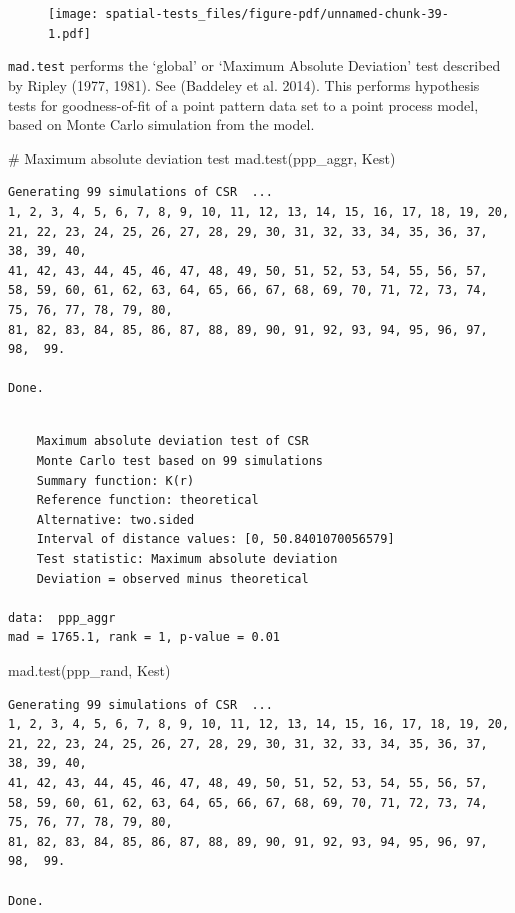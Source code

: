 \documentclass[
  letterpaper,
]{book}
\newenvironment{Shaded}{\begin{snugshade}}{\end{snugshade}}
\newcommand{\CommentTok}[1]{\textcolor[rgb]{0.37,0.37,0.37}{#1}}
\newcommand{\FunctionTok}[1]{\textcolor[rgb]{0.28,0.35,0.67}{#1}}
\newcommand{\NormalTok}[1]{\textcolor[rgb]{0.00,0.23,0.31}{#1}}
\begin{document}
\begin{figure}[H]

\texttt{[image: spatial-tests\_files/figure-pdf/unnamed-chunk-39-1.pdf]} \hfill{}

\end{figure}

\texttt{mad.test} performs the `global' or `Maximum Absolute Deviation'
test described by Ripley (1977, 1981). See (Baddeley et al. 2014). This
performs hypothesis tests for goodness-of-fit of a point pattern data
set to a point process model, based on Monte Carlo simulation from the
model.

\begin{Shaded}
\begin{Highlighting}[]
\CommentTok{\# Maximum absolute deviation test}
\FunctionTok{mad.test}\NormalTok{(ppp\_aggr, Kest)}
\end{Highlighting}
\end{Shaded}

\begin{verbatim}
Generating 99 simulations of CSR  ...
1, 2, 3, 4, 5, 6, 7, 8, 9, 10, 11, 12, 13, 14, 15, 16, 17, 18, 19, 20, 21, 22, 23, 24, 25, 26, 27, 28, 29, 30, 31, 32, 33, 34, 35, 36, 37, 38, 39, 40,
41, 42, 43, 44, 45, 46, 47, 48, 49, 50, 51, 52, 53, 54, 55, 56, 57, 58, 59, 60, 61, 62, 63, 64, 65, 66, 67, 68, 69, 70, 71, 72, 73, 74, 75, 76, 77, 78, 79, 80,
81, 82, 83, 84, 85, 86, 87, 88, 89, 90, 91, 92, 93, 94, 95, 96, 97, 98,  99.

Done.
\end{verbatim}

\begin{verbatim}

    Maximum absolute deviation test of CSR
    Monte Carlo test based on 99 simulations
    Summary function: K(r)
    Reference function: theoretical
    Alternative: two.sided
    Interval of distance values: [0, 50.8401070056579]
    Test statistic: Maximum absolute deviation
    Deviation = observed minus theoretical

data:  ppp_aggr
mad = 1765.1, rank = 1, p-value = 0.01
\end{verbatim}

\begin{Shaded}
\begin{Highlighting}[]
\FunctionTok{mad.test}\NormalTok{(ppp\_rand, Kest)}
\end{Highlighting}
\end{Shaded}

\begin{verbatim}
Generating 99 simulations of CSR  ...
1, 2, 3, 4, 5, 6, 7, 8, 9, 10, 11, 12, 13, 14, 15, 16, 17, 18, 19, 20, 21, 22, 23, 24, 25, 26, 27, 28, 29, 30, 31, 32, 33, 34, 35, 36, 37, 38, 39, 40,
41, 42, 43, 44, 45, 46, 47, 48, 49, 50, 51, 52, 53, 54, 55, 56, 57, 58, 59, 60, 61, 62, 63, 64, 65, 66, 67, 68, 69, 70, 71, 72, 73, 74, 75, 76, 77, 78, 79, 80,
81, 82, 83, 84, 85, 86, 87, 88, 89, 90, 91, 92, 93, 94, 95, 96, 97, 98,  99.

Done.
\end{verbatim}
\end{document}
